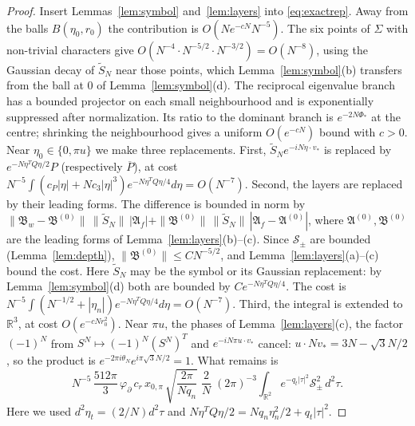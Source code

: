 \documentclass[11pt]{amsart}
\theoremstyle{definition}
\theoremstyle{remark}
\newcommand{\R}{\mathbb{R}}
\newcommand{\cS}{\mathcal{S}}
\begin{document}
\begin{proof}
Insert Lemmas~\ref{lem:symbol} and~\ref{lem:layers} into
\eqref{eq:exactrep}.  Away from the balls $B(\eta_0,r_0)$ the contribution is
$O(Ne^{-cN}N^{-5})$.  The six points of $\Sigma$ with non-trivial
characters give $O(N^{-4}\cdot N^{-5/2}\cdot N^{-3/2})=O(N^{-8})$, using the
Gaussian decay of $\widetilde S_N$ near those points, which
Lemma~\ref{lem:symbol}(b) transfers from the ball at $0$ of
Lemma~\ref{lem:symbol}(d).  The reciprocal eigenvalue branch has a bounded
projector on each small neighbourhood and is exponentially suppressed
after normalization. Its ratio to the dominant branch is
$e^{-2N\Phi_*}$ at the centre; shrinking the neighbourhood gives a
uniform $O(e^{-cN})$ bound with $c>0$. Near $\eta_0\in\{0,\pi u\}$ we make
three replacements.  First, $\widetilde S_Ne^{-iN\eta\cdot v_*}$ is replaced
by $e^{-N\eta^TQ\eta/2}P$ (respectively $\overline P$), at cost
$N^{-5}\int(c_P|\eta|+Nc_3|\eta|^3)e^{-N\eta^TQ\eta/4}d\eta=O(N^{-7})$.
Second, the layers are replaced by their leading forms.  The difference is
bounded in norm by $\|\mathfrak B_w-\mathfrak B^{(0)}\|\,\|\widetilde S_N\|\,|\mathfrak A_f|+\|\mathfrak B^{(0)}\|\,\|\widetilde S_N\|\,|\mathfrak A_f-\mathfrak A^{(0)}|$,
where $\mathfrak A^{(0)},\mathfrak B^{(0)}$ are the leading forms of
Lemma~\ref{lem:layers}(b)--(c).  Since $\cS_\pm$ are bounded
(Lemma~\ref{lem:depth}), $\|\mathfrak B^{(0)}\|\le CN^{-5/2}$, and
Lemma~\ref{lem:layers}(a)--(c) bound the cost.  Here $\widetilde S_N$ may be
the symbol or its Gaussian replacement: by Lemma~\ref{lem:symbol}(d) both
are bounded by $Ce^{-N\eta^TQ\eta/4}$.  The cost is
$N^{-5}\int(N^{-1/2}+|\eta_n|)e^{-N\eta^TQ\eta/4}d\eta=O(N^{-7})$.  Third,
the integral is extended to $\R^3$, at cost $O(e^{-cNr_0^2})$.  Near
$\pi u$, the phases of Lemma~\ref{lem:layers}(c), the factor $(-1)^N$ from
$S^N\mapsto(-1)^N(S^N)^T$ and $e^{-iN\pi u\cdot v_*}$ cancel:
$u\cdot Nv_*=3N-\sqrt3N/2$, so the product is
$e^{-2\pi i\theta_N}e^{i\pi\sqrt3N/2}=1$.  What
remains is
\[
N^{-5}\,\frac{512\pi}{3}\,\varphi_\partial\,c_r\,x_{0,\pi}\,\sqrt{\frac{2\pi}{Nq_n}}\;\frac2N\;(2\pi)^{-3}\int_{\R^2}e^{-q_t|\tau|^2}\cS_\pm^2\,d^2\tau .
\]
Here we used $d^2\eta_t=(2/N)d^2\tau$ and
$N\eta^TQ\eta/2=Nq_n\eta_n^2/2+q_t|\tau|^2$.
\end{proof}
\end{document}
